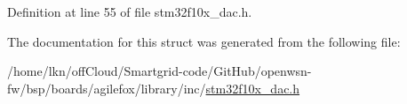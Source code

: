 Definition at line 55 of file stm32f10x\+\_\+dac.\+h.



The documentation for this struct was generated from the following file\+:\begin{DoxyCompactItemize}
\item 
/home/lkn/off\+Cloud/\+Smartgrid-\/code/\+Git\+Hub/openwsn-\/fw/bsp/boards/agilefox/library/inc/\hyperlink{agilefox_2library_2inc_2stm32f10x__dac_8h}{stm32f10x\+\_\+dac.\+h}\end{DoxyCompactItemize}
